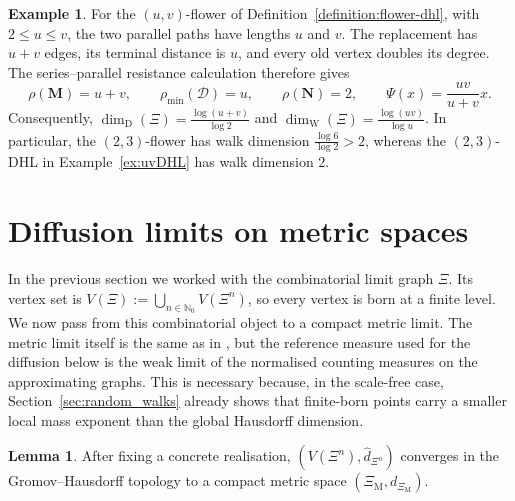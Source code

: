 \documentclass{article}
\theoremstyle{plain}
\theoremstyle{definition}
\newtheorem{lemma}[theorem]{Lemma}
\newtheorem{example}[theorem]{Example}
\newcommand{\dimdeg}{\dim_\mathrm{D}}
\newcommand{\dimwalk}{\dim_\mathrm{W}}
\begin{document}
\begin{example}\label{ex:uvFlower}
For the $(u,v)$-flower of Definition~\ref{definition:flower-dhl}, with $2\le u\le v$, the two parallel paths have lengths $u$ and $v$.
The replacement has $u+v$ edges, its terminal distance is $u$, and every old vertex doubles its degree.
The series--parallel resistance calculation therefore gives
\[
\rho(\mathbf M)=u+v,\qquad
\rho_{\min}(\mathcal D)=u,\qquad
\rho(\mathbf N)=2,\qquad
\Psi(x)=\frac{uv}{u+v}x.
\]
Consequently, $\dimdeg(\Xi)=\frac{\log(u+v)}{\log2}$ and $\dimwalk(\Xi)=\frac{\log(uv)}{\log u}$.
In particular, the $(2,3)$-flower has walk dimension $\frac{\log6}{\log2}>2$, whereas the $(2,3)$-DHL in Example~\ref{ex:uvDHL} has walk dimension $2$.
\end{example}





























\section{Diffusion limits on metric spaces}\label{sec:diffusion}

In the previous section we worked with the combinatorial limit graph $\Xi$.
Its vertex set is $V(\Xi):=\bigcup_{n\in\mathbb N_0}V(\Xi^n)$, so every vertex is born at a finite level.
We now pass from this combinatorial object to a compact metric limit.
The metric limit itself is the same as in \cite{neroli2024fractal}, but the reference measure used for the diffusion below is the weak limit of the normalised counting measures on the approximating graphs.
This is necessary because, in the scale-free case, Section~\ref{sec:random_walks} already shows that finite-born points carry a smaller local mass exponent than the global Hausdorff dimension.

\begin{lemma}\label{lem:GH_limit_metric}
After fixing a concrete realisation, $(V(\Xi^n),\hat d_{\Xi^n})$ converges in the Gromov--Hausdorff topology to a compact metric space $(\Xi_{\mathrm M},d_{\Xi_{\mathrm M}})$.
\end{lemma}
\end{document}
